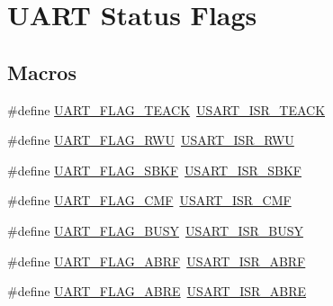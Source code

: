 \hypertarget{group___u_a_r_t___flags}{}\section{U\+A\+RT Status Flags}
\label{group___u_a_r_t___flags}
\subsection*{Macros}
\begin{DoxyCompactItemize}
\item 
\#define \mbox{\hyperlink{group___u_a_r_t___flags_gaf4a4ade6fd987ea7f22786269317f94a}{U\+A\+R\+T\+\_\+\+F\+L\+A\+G\+\_\+\+T\+E\+A\+CK}}~\mbox{\hyperlink{group___peripheral___registers___bits___definition_gaf1433ae77d20ec6da645117cde536f81}{U\+S\+A\+R\+T\+\_\+\+I\+S\+R\+\_\+\+T\+E\+A\+CK}}
\item 
\#define \mbox{\hyperlink{group___u_a_r_t___flags_ga5d5f6f91093bfb222baa277a86f6b75b}{U\+A\+R\+T\+\_\+\+F\+L\+A\+G\+\_\+\+R\+WU}}~\mbox{\hyperlink{group___peripheral___registers___bits___definition_ga0df19201dd47f3bd43954621c88ef4a3}{U\+S\+A\+R\+T\+\_\+\+I\+S\+R\+\_\+\+R\+WU}}
\item 
\#define \mbox{\hyperlink{group___u_a_r_t___flags_gaea7a67e1f6a8af78e2adfaed59d1a4be}{U\+A\+R\+T\+\_\+\+F\+L\+A\+G\+\_\+\+S\+B\+KF}}~\mbox{\hyperlink{group___peripheral___registers___bits___definition_ga74aecf8406973a8fd5c02615d8a7b2d1}{U\+S\+A\+R\+T\+\_\+\+I\+S\+R\+\_\+\+S\+B\+KF}}
\item 
\#define \mbox{\hyperlink{group___u_a_r_t___flags_ga01f2c67d8999a9ee8d91ac3cb5e7fbfe}{U\+A\+R\+T\+\_\+\+F\+L\+A\+G\+\_\+\+C\+MF}}~\mbox{\hyperlink{group___peripheral___registers___bits___definition_ga8199e4dab14311318c87b77ef758c2f9}{U\+S\+A\+R\+T\+\_\+\+I\+S\+R\+\_\+\+C\+MF}}
\item 
\#define \mbox{\hyperlink{group___u_a_r_t___flags_ga2d1387d412382a345097acb403748ba3}{U\+A\+R\+T\+\_\+\+F\+L\+A\+G\+\_\+\+B\+U\+SY}}~\mbox{\hyperlink{group___peripheral___registers___bits___definition_gafb7fb858e7f0dec99740570ecfb922cc}{U\+S\+A\+R\+T\+\_\+\+I\+S\+R\+\_\+\+B\+U\+SY}}
\item 
\#define \mbox{\hyperlink{group___u_a_r_t___flags_ga9e309874f2c8f71e4049ae6cb702a2eb}{U\+A\+R\+T\+\_\+\+F\+L\+A\+G\+\_\+\+A\+B\+RF}}~\mbox{\hyperlink{group___peripheral___registers___bits___definition_gafbbfac6c1ba908d265572184b02daed2}{U\+S\+A\+R\+T\+\_\+\+I\+S\+R\+\_\+\+A\+B\+RF}}
\item 
\#define \mbox{\hyperlink{group___u_a_r_t___flags_ga87853efaab808377c8acb9e8b671a2e8}{U\+A\+R\+T\+\_\+\+F\+L\+A\+G\+\_\+\+A\+B\+RE}}~\mbox{\hyperlink{group___peripheral___registers___bits___definition_gae762a0bed3b7ecde26377eccd40d1e10}{U\+S\+A\+R\+T\+\_\+\+I\+S\+R\+\_\+\+A\+B\+RE}}

\end{DoxyCompactItemize}
